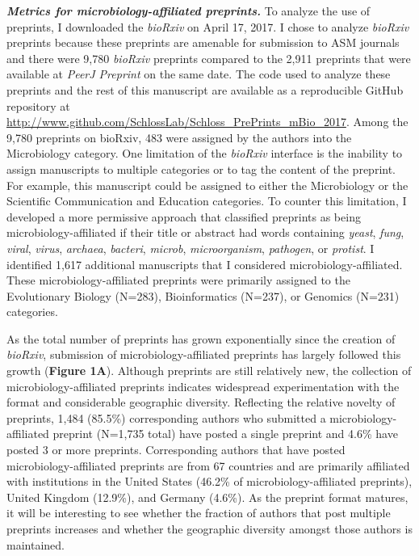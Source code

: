 \documentclass[11pt,]{article}
\begin{document}
\textbf{\emph{Metrics for microbiology-affiliated preprints.}} To
analyze the use of preprints, I downloaded the \emph{bioRxiv} on April
17, 2017. I chose to analyze \emph{bioRxiv} preprints because these
preprints are amenable for submission to ASM journals and there were
9,780 \emph{bioRxiv} preprints compared to the 2,911 preprints that were
available at \emph{PeerJ Preprint} on the same date. The code used to
analyze these preprints and the rest of this manuscript are available as
a reproducible GitHub repository at
\url{http://www.github.com/SchlossLab/Schloss_PrePrints_mBio_2017}.
Among the 9,780 preprints on bioRxiv, 483 were assigned by the authors
into the Microbiology category. One limitation of the \emph{bioRxiv}
interface is the inability to assign manuscripts to multiple categories
or to tag the content of the preprint. For example, this manuscript
could be assigned to either the Microbiology or the Scientific
Communication and Education categories. To counter this limitation, I
developed a more permissive approach that classified preprints as being
microbiology-affiliated if their title or abstract had words containing
\emph{yeast}, \emph{fung}, \emph{viral}, \emph{virus}, \emph{archaea},
\emph{bacteri}, \emph{microb}, \emph{microorganism}, \emph{pathogen}, or
\emph{protist}. I identified 1,617 additional manuscripts that I
considered microbiology-affiliated. These microbiology-affiliated
preprints were primarily assigned to the Evolutionary Biology (N=283),
Bioinformatics (N=237), or Genomics (N=231) categories.

As the total number of preprints has grown exponentially since the
creation of \emph{bioRxiv}, submission of microbiology-affiliated
preprints has largely followed this growth (\textbf{Figure 1A}).
Although preprints are still relatively new, the collection of
microbiology-affiliated preprints indicates widespread experimentation
with the format and considerable geographic diversity. Reflecting the
relative novelty of preprints, 1,484 (85.5\%) corresponding authors who
submitted a microbiology-affiliated preprint (N=1,735 total) have posted
a single preprint and 4.6\% have posted 3 or more preprints.
Corresponding authors that have posted microbiology-affiliated preprints
are from 67 countries and are primarily affiliated with institutions in
the United States (46.2\% of microbiology-affiliated preprints), United
Kingdom (12.9\%), and Germany (4.6\%). As the preprint format matures,
it will be interesting to see whether the fraction of authors that post
multiple preprints increases and whether the geographic diversity
amongst those authors is maintained.
\end{document}
